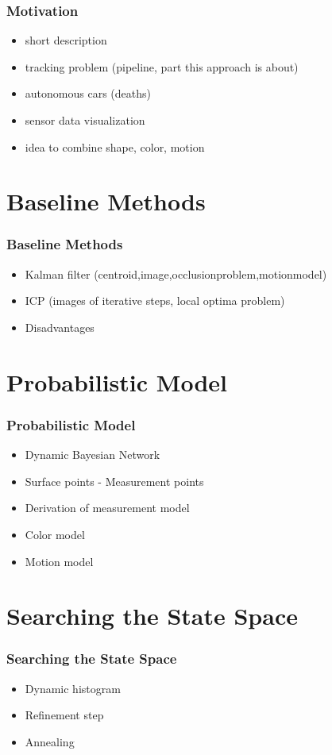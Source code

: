 \begin{frame}
  \frametitle{Motivation}
  \begin{itemize}
  \item short description
  \item tracking problem (pipeline, part this approach is about)
  \item autonomous cars (deaths)
  \item sensor data visualization
  \item idea to combine shape, color, motion
  \end{itemize}
\end{frame}

\section{Baseline Methods}
\begin{frame}
  \frametitle{Baseline Methods}
  \begin{itemize}
  \item Kalman filter (centroid,image,occlusionproblem,motionmodel)
  \item ICP (images of iterative steps, local optima problem)
  \item Disadvantages
  \end{itemize}
\end{frame}

\section{Probabilistic Model}
\begin{frame}
  \frametitle{Probabilistic Model}
  \begin{itemize}
  \item Dynamic Bayesian Network
  \item Surface points - Measurement points
  \item Derivation of measurement model
  \item Color model
  \item Motion model
  \end{itemize}
\end{frame}

\section{Searching the State Space}
\begin{frame}
  \frametitle{Searching the State Space}
  \begin{itemize}
  \item Dynamic histogram
  \item Refinement step
  \item Annealing
  \end{itemize}
\end{frame}

